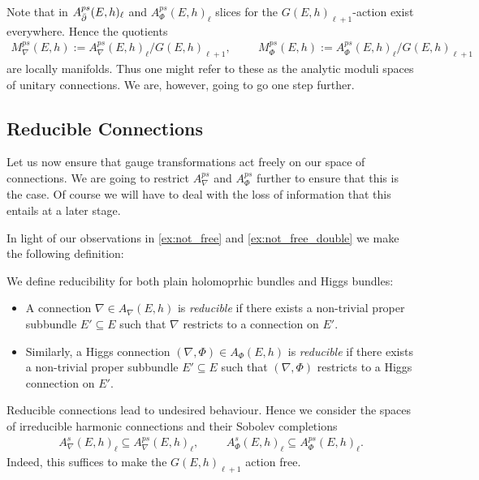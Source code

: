 \documentclass[12pt]{ociamthesis}  %
\begin{document}
Note that in $A^{ps}_{\bar{\partial}}(E,h)_\ell$ and $A^{ps}_\Phi(E,h)_\ell$ slices for the
$G(E,h)_{\ell+1}$-action exist everywhere. Hence the quotients
\begin{align*}
  M^{ps}_\nabla(E,h) := A^{ps}_\nabla(E,h)_\ell / G(E,h)_{\ell+1},\hspace{1cm}
  M^{ps}_\Phi(E,h) := A^{ps}_\Phi(E,h)_\ell / G(E,h)_{\ell+1}
\end{align*}
are locally manifolds. Thus one might refer to these as the analytic
moduli spaces of unitary connections. We are, however, going to go
one step further.

\subsection{Reducible Connections}

Let us now ensure that gauge transformations act freely on
our space of connections. We are going to restrict $A^{ps}_\nabla$ and
$A^{ps}_\Phi$ further to ensure that this is the case. Of course we will have
to deal with the loss of information that this entails at a later stage.

In light of our observations in \ref{ex:not_free} and \ref{ex:not_free_double}
we make the following definition:

\begin{definition}
  We define reducibility for both plain holomoprhic bundles and Higgs
  bundles:
  \begin{itemize}
    \item A connection $\nabla\in A_\nabla (E,h)$ is \emph{reducible} if there exists
          a non-trivial proper subbundle $E'\subseteq E$ such that $\nabla$ restricts
          to a connection on $E'$.
    \item Similarly, a Higgs connection $(\nabla,\Phi)\in A_\Phi(E,h)$ is
          \emph{reducible} if there exists a non-trivial proper subbundle $E'\subseteq E$
          such that $(\nabla,\Phi)$ restricts to a Higgs connection on $E'$.
  \end{itemize}
\end{definition}

Reducible connections lead to undesired behaviour. Hence we
consider the spaces of irreducible harmonic connections and their Sobolev
completions
\begin{align*}
  A^s_\nabla(E,h)_\ell \subseteq A^{ps}_\nabla(E,h)_\ell,\hspace{1cm}
  A^s_\Phi(E,h)_\ell \subseteq A^{ps}_\Phi(E,h)_\ell.
\end{align*}
Indeed, this suffices to make the $G(E,h)_{\ell+1}$ action free.
\end{document}

